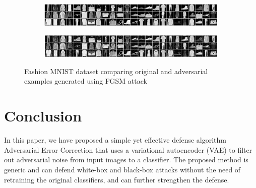 \documentclass[journal]{IEEEtran}
\begin{document}
\begin{figure}[t]
	\centering

	\begin{subfigure}{\textwidth}
		\centering
		\includegraphics[width=\textwidth]{Images/MNIST/FGSM/Original.png}
	\end{subfigure}
	\begin{subfigure}{\textwidth}
		\centering
		\includegraphics[width=\textwidth]{Images/MNIST/FGSM/FGSM.png}
	\end{subfigure}

	\caption{Fashion MNIST dataset comparing original and adversarial examples generated using FGSM\cite{FGSM} attack}
	
	\label{fig:FMNISTFGSM}
\end{figure}

\section{Conclusion}
In this paper, we have proposed a simple yet effective defense algorithm Adversarial Error Correction that uses a variational autoencoder (VAE) to filter out adversarial noise from input images to a classifier. The proposed method is generic and can defend white-box and black-box attacks without the need of retraining the original classifiers, and can further strengthen the defense.



\end{document}
